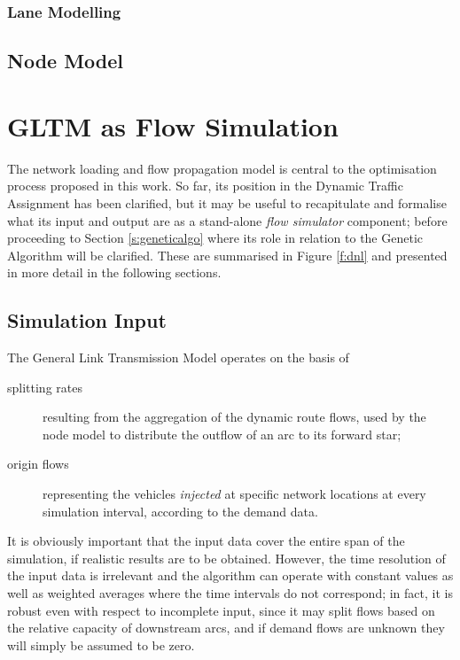 




\subsubsection{Lane Modelling}

\subsection{Node Model} \label{s:nodemodel}

\section{GLTM as Flow Simulation}
The network loading and flow propagation model is central to the optimisation process proposed in this work.
So far, its position in the Dynamic Traffic Assignment has been clarified, but it may be useful to recapitulate and formalise what its input and output are as a stand-alone \emph{flow simulator} component; before proceeding to Section \ref{s:geneticalgo} where its role in relation to the Genetic Algorithm will be clarified. These are summarised in Figure \ref{f:dnl} and presented in more detail in the following sections.


\subsection{Simulation Input}
The General Link Transmission Model operates on the basis of
\begin{description}
\item[splitting rates] resulting from the aggregation of the dynamic route flows, used by the node model to distribute the outflow of an arc to its forward star;
\item[origin flows] representing the vehicles \emph{injected} at specific network locations at every simulation interval, according to the demand data.
\end{description}

It is obviously important that the input data cover the entire span of the simulation, if realistic results are to be obtained.
However, the time resolution of the input data is irrelevant and the algorithm can operate with constant values as well as weighted averages where the time intervals do not correspond; in fact, it is robust even with respect to incomplete input, since it may split flows based on the relative capacity of downstream arcs, and if demand flows are unknown they will simply be assumed to be zero.


